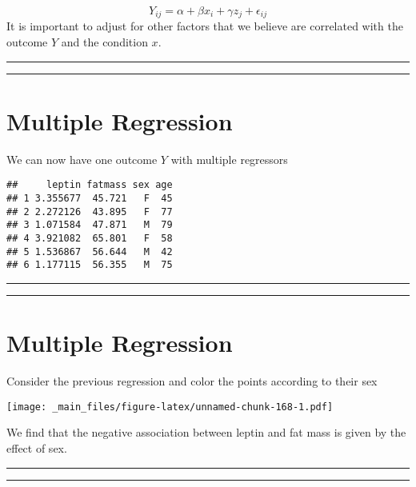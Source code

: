 \documentclass[
]{book}
\begin{document}
\[Y_{ij} = \alpha + \beta x_i +\gamma z_j+\epsilon_{ij}\]
It is important to adjust for other factors that we believe are correlated with the outcome \(Y\) and the condition \(x\).

\begin{center}\rule{0.5\linewidth}{0.5pt}\end{center}

\begin{center}\rule{0.5\linewidth}{0.5pt}\end{center}

\hypertarget{multiple-regression-1}{%
\section{Multiple Regression}\label{multiple-regression-1}}

We can now have one outcome \(Y\) with multiple regressors

\begin{verbatim}
##     leptin fatmass sex age
## 1 3.355677  45.721   F  45
## 2 2.272126  43.895   F  77
## 3 1.071584  47.871   M  79
## 4 3.921082  65.801   F  58
## 5 1.536867  56.644   M  42
## 6 1.177115  56.355   M  75
\end{verbatim}

\begin{center}\rule{0.5\linewidth}{0.5pt}\end{center}

\begin{center}\rule{0.5\linewidth}{0.5pt}\end{center}

\hypertarget{multiple-regression-2}{%
\section{Multiple Regression}\label{multiple-regression-2}}

Consider the previous regression and color the points according to their sex

\texttt{[image: \_main\_files/figure-latex/unnamed-chunk-168-1.pdf]}

We find that the negative association between leptin and fat mass is given by the effect of sex.

\begin{center}\rule{0.5\linewidth}{0.5pt}\end{center}

\begin{center}\rule{0.5\linewidth}{0.5pt}\end{center}
\end{document}
